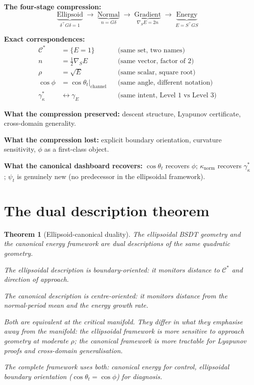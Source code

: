 \documentclass[11pt,a4paper,openany]{book}
\newtheorem{theorem}{Theorem}[chapter]
\theoremstyle{definition}
\begin{document}
\begin{lockedbox}
\textbf{The four-stage compression:}
\[
\underbrace{\text{Ellipsoid}}_{\delta^\top G\delta = 1}
\;\to\;
\underbrace{\text{Normal}}_{{n = G\delta}}
\;\to\;
\underbrace{\text{Gradient}}_{\nabla_S E = 2n}
\;\to\;
\underbrace{\text{Energy}}_{E = S^\top GS}
\]

\textbf{Exact correspondences:}
\begin{align*}
\mathcal{C}^* &= \{E = 1\} &&\text{(same set, two names)}\\
n &= \tfrac{1}{2}\nabla_S E &&\text{(same vector, factor of 2)}\\
\rho &= \sqrt{E} &&\text{(same scalar, square root)}\\
\cos\phi &= \cos\theta_t|_\mathrm{channel} &&\text{(same angle, different notation)}\\
\gamma^*_\kappa &\leftrightarrow \gamma_E &&\text{(same intent, Level 1 vs Level 3)}
\end{align*}

\textbf{What the compression preserved:}
descent structure, Lyapunov certificate, cross-domain generality.

\textbf{What the compression lost:}
explicit boundary orientation, curvature sensitivity, $\phi$ as a first-class object.

\textbf{What the canonical dashboard recovers:}
$\cos\theta_t$ recovers $\phi$;
$\kappa_\mathrm{norm}$ recovers $\gamma^*_\kappa$;
$\psi_t$ is genuinely new (no predecessor in the ellipsoidal framework).
\end{lockedbox}

\section{The dual description theorem}

\begin{theorem}[Ellipsoid-canonical duality]
The ellipsoidal BSDT geometry and the canonical energy framework are
dual descriptions of the same quadratic geometry.

The ellipsoidal description is boundary-oriented:
it monitors distance to $\mathcal{C}^*$ and direction of approach.

The canonical description is centre-oriented:
it monitors distance from the normal-period mean and the energy growth rate.

Both are equivalent at the critical manifold. They differ in what they emphasise
away from the manifold:
the ellipsoidal framework is more sensitive to approach geometry at moderate $\rho$;
the canonical framework is more tractable for Lyapunov proofs and cross-domain generalisation.

The complete framework uses both: canonical energy for control,
ellipsoidal boundary orientation ($\cos\theta_t = \cos\phi$) for diagnosis.
\end{theorem}
\end{document}
